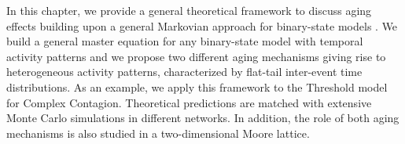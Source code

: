 In this chapter, we provide a general theoretical framework to discuss aging effects building upon a general Markovian approach for binary-state models \cite{gleeson-2011,gleeson-2013}. We build a general master equation for any binary-state model with temporal activity patterns and we propose two different aging mechanisms giving rise to heterogeneous activity patterns, characterized by flat-tail inter-event time distributions. As an example, we apply this framework to the Threshold model for Complex Contagion.
Theoretical predictions are matched with extensive Monte Carlo simulations in different networks. In addition, the role of both aging mechanisms is also studied in a two-dimensional Moore lattice. 

